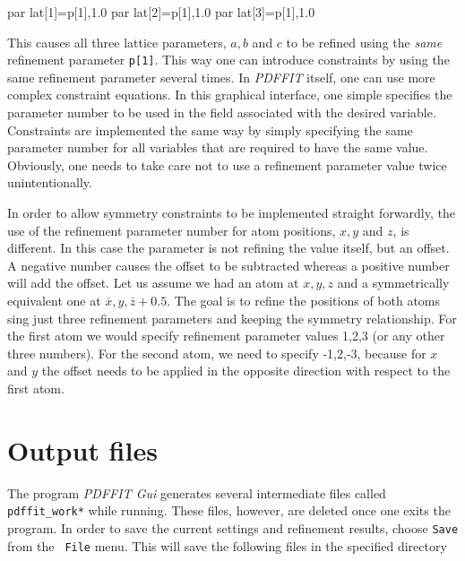 \begin{MacVerbatim}
  par lat[1]=p[1],1.0
  par lat[2]=p[1],1.0
  par lat[3]=p[1],1.0
\end{MacVerbatim}

This causes all three lattice parameters, $a,b$ and $c$ to be
refined using the {\it same} refinement parameter {\tt p[1]}. This
way one can introduce constraints by using the same refinement
parameter several times. In {\it PDFFIT} itself, one can use more
complex constraint equations. In this graphical interface, one
simple specifies the parameter number to be used in the field
associated with the desired variable. Constraints are implemented
the same way by simply specifying the same parameter number for all
variables that are required to have the same value. Obviously, one
needs to take care not to use a refinement parameter value twice
unintentionally.\par

In order to allow symmetry constraints to be implemented straight
forwardly, the use of the refinement parameter number for atom
positions, $x, y$ and $z$, is different. In this case the parameter
is not refining the value itself, but an offset. A negative number
causes the offset to be subtracted whereas a positive number will
add the offset. Let us assume we had an atom at $x,y,z$ and a
symmetrically equivalent one at $\overline{x},y,\overline{z}+0.5$.
The goal is to refine the positions of both atoms sing just three
refinement parameters and keeping the symmetry relationship. For the
first atom we would specify refinement parameter values 1,2,3 (or
any other three numbers). For the second atom, we need to specify
-1,2,-3, because for $x$ and $y$ the offset needs to be applied in
the opposite direction with respect to the first atom.


\section{Output files}

The program {\it PDFFIT Gui} generates several intermediate files
called {\tt pdffit\_work*} while running. These files, however, are
deleted once one exits the program. In order to save the current
settings and refinement results, choose {\tt Save} from the {\tt
File} menu. This will save the following files in the specified
directory

